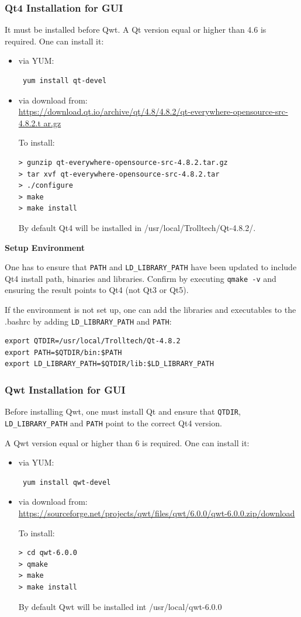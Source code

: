 \documentclass{article}
\begin{document}
\subsubsection{Qt4 Installation for GUI}
It must be installed before Qwt. A Qt version equal or higher than 4.6 is
required. One can install it:
\begin{itemize}
 \item via YUM:
\begin{verbatim}
 yum install qt-devel
\end{verbatim}
 \item via download from:\\
\url{
https://download.qt.io/archive/qt/4.8/4.8.2/qt-everywhere-opensource-src-4.8.2.t
ar.gz} \bigskip

\noindent To install:
\begin{verbatim}
> gunzip qt-everywhere-opensource-src-4.8.2.tar.gz
> tar xvf qt-everywhere-opensource-src-4.8.2.tar
> ./configure
> make
> make install
\end{verbatim}
By default Qt4 will be installed in /usr/local/Trolltech/Qt-4.8.2/. 
\end{itemize}

\noindent \textbf{Setup Environment} 

\noindent One has to ensure that \verb=PATH= and \verb=LD_LIBRARY_PATH= have
been updated to include Qt4 install path, binaries and libraries.
Confirm by executing \verb=qmake -v= and ensuring the result points to Qt4 (not
Qt3 or Qt5). \bigskip

\noindent If the environment is not set up, one can add the libraries and
executables to the .bashrc by adding
\verb=LD_LIBRARY_PATH= and \verb=PATH=:
\begin{verbatim}
export QTDIR=/usr/local/Trolltech/Qt-4.8.2
export PATH=$QTDIR/bin:$PATH
export LD_LIBRARY_PATH=$QTDIR/lib:$LD_LIBRARY_PATH
\end{verbatim}


\subsubsection{Qwt Installation for GUI}
Before installing Qwt, one must install Qt
and ensure that \verb=QTDIR=, \verb=LD_LIBRARY_PATH= and \verb=PATH= point to
the correct Qt4
version. \bigskip

\noindent A Qwt version equal or higher than 6 is required. One can
install it:
\begin{itemize}
 \item via YUM:
\begin{verbatim}
 yum install qwt-devel
\end{verbatim}
 \item via download from:\\
\url{
https://sourceforge.net/projects/qwt/files/qwt/6.0.0/qwt-6.0.0.zip/download}
\bigskip

\noindent To install:
\begin{verbatim}
> cd qwt-6.0.0
> qmake
> make
> make install
\end{verbatim}
By default Qwt will be installed int /usr/local/qwt-6.0.0 
\end{itemize}
\end{document}
